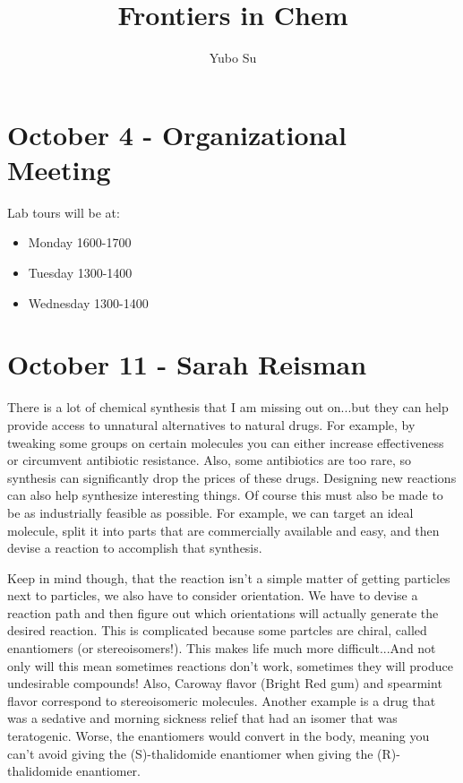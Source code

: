 \documentclass{report}
\begin{document}
\title{Frontiers in Chem}
\author{Yubo Su}
\date{ }

\maketitle

\tableofcontents

\chapter{October 4 - Organizational Meeting}

Lab tours will be at:

\begin{itemize}
\item Monday 1600-1700
\item Tuesday 1300-1400
\item Wednesday 1300-1400
\end{itemize}

\chapter{October 11 - Sarah Reisman}

There is a lot of chemical synthesis that I am missing out on...but they can help provide access to unnatural alternatives to natural drugs. For example, by tweaking some groups on certain molecules you can either increase effectiveness or circumvent antibiotic resistance. Also, some antibiotics are too rare, so synthesis can significantly drop the prices of these drugs. Designing new reactions can also help synthesize interesting things. Of course this must also be made to be as industrially feasible as possible. For example, we can target an ideal molecule, split it into parts that are commercially available and easy, and then devise a reaction to accomplish that synthesis.

Keep in mind though, that the reaction isn't a simple matter of getting particles next to particles, we also have to consider orientation. We have to devise a reaction path and then figure out which orientations will actually generate the desired reaction. This is complicated because some partcles are chiral, called enantiomers (or stereoisomers!). This makes life much more difficult...And not only will this mean sometimes reactions don't work, sometimes they will produce undesirable compounds! Also, Caroway flavor (Bright Red gum) and spearmint flavor correspond to stereoisomeric molecules. Another example is a drug that was a sedative and morning sickness relief that had an isomer that was teratogenic. Worse, the enantiomers would convert in the body, meaning you can't avoid giving the (S)-thalidomide enantiomer when giving the (R)-thalidomide enantiomer.
\end{document}
